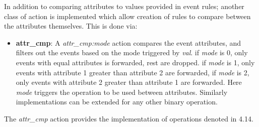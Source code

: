 In addition to comparing attributes to values provided in event rules; another class of action is implemented which allow creation of rules to compare between the attributes themselves. This is done via:
\begin{itemize}
 \item \textbf{attr_cmp}: A \textit{attr_cmp:mode} action compares the event attributes, and filters out the events based on the mode triggered by \textit{val}. if \textit{mode} is 0, only events with equal attributes is forwarded, rest are dropped. if \textit{mode} is 1, only events with attribute 1 greater than attribute 2 are forwarded, if \textit{mode} is 2, only events with attribute 2 greater than attribute 1 are forwarded. Here \textit{mode} triggers the operation to be used between attributes. Similarly implementations can be extended for any other binary operation.
\end{itemize}
The  \textit{attr_cmp} action provides the implementation of operations denoted in 4.14.

